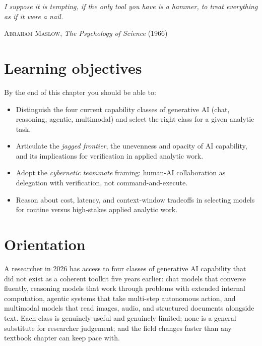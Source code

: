 \documentclass[
  letterpaper,
  11pt]{scrbook}
\newcounter{none} %
\providecommand{\tightlist}{%
  \setlength{\itemsep}{0pt}\setlength{\parskip}{0pt}}
\begin{document}
\begin{flushright}\small

\emph{I suppose it is tempting, if the only tool you have is a hammer,
to treat everything as if it were a nail.}

\textsc{Abraham Maslow}, \emph{The Psychology of Science} (1966)

\end{flushright}

\section{Learning objectives}\label{learning-objectives-1}

By the end of this chapter you should be able to:

\begin{itemize}
\tightlist
\item
  Distinguish the four current capability classes of generative AI
  (chat, reasoning, agentic, multimodal) and select the right class for
  a given analytic task.
\item
  Articulate the \emph{jagged frontier}, the unevenness and opacity of
  AI capability, and its implications for verification in applied
  analytic work.
\item
  Adopt the \emph{cybernetic teammate} framing: human-AI collaboration
  as delegation with verification, not command-and-execute.
\item
  Reason about cost, latency, and context-window tradeoffs in selecting
  models for routine versus high-stakes applied analytic work.
\end{itemize}

\section{Orientation}\label{orientation-1}

A researcher in 2026 has access to four classes of generative AI
capability that did not exist as a coherent toolkit five years earlier:
chat models that converse fluently, reasoning models that work through
problems with extended internal computation, agentic systems that take
multi-step autonomous action, and multimodal models that read images,
audio, and structured documents alongside text. Each class is genuinely
useful and genuinely limited; none is a general substitute for
researcher judgement; and the field changes faster than any textbook
chapter can keep pace with.
\end{document}
